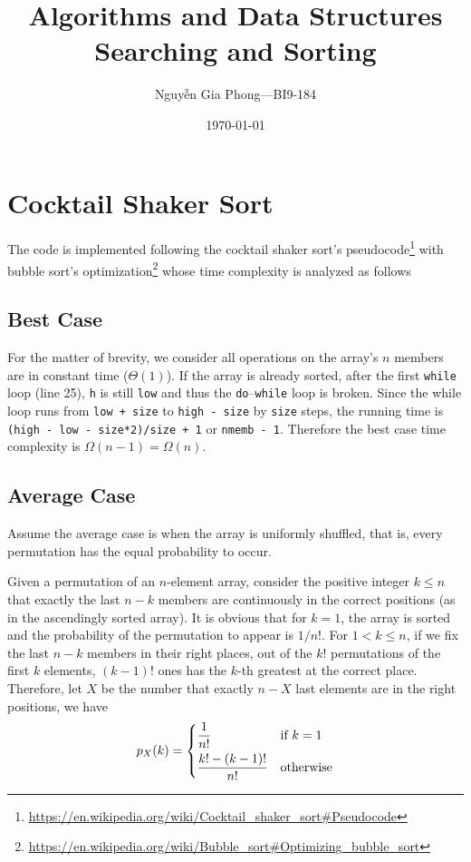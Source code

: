 \documentclass[a4paper,12pt]{article}
\title{Algorithms and Data Structures\\ Searching and Sorting}
\author{Nguyễn Gia Phong---BI9-184}
\date{\dateenglish\today}
\begin{document}
\maketitle
\section{Cocktail Shaker Sort}
The code is implemented following the cocktail shaker sort's
pseudocode\footnote{\url{https://en.wikipedia.org/wiki/Cocktail\_shaker\_sort\#Pseudocode}}
with bubble sort's optimization\footnote{\url{https://en.wikipedia.org/wiki/Bubble\_sort\#Optimizing\_bubble\_sort}}
whose time complexity is analyzed as follows

\subsection{Best Case}
For the matter of brevity, we consider all operations on the array's $n$ members
are in constant time ($\Theta(1)$).  If the array is already sorted, after
the first \verb|while| loop (line 25), \verb|h| is still \verb|low| and thus
the \verb|do|--\verb|while| loop is broken.  Since the while loop runs from
\verb|low + size| to \verb|high - size| by \verb|size| steps, the running time
is \verb|(high - low - size*2)/size + 1| or \verb|nmemb - 1|.  Therefore
the best case time complexity is $\Omega(n - 1) = \Omega(n)$.

\subsection{Average Case}
Assume the average case is when the array is uniformly shuffled, that is,
every permutation has the equal probability to occur.

Given a permutation of an $n$-element array, consider the positive integer
$k \le n$ that exactly the last $n - k$ members are continuously in the
correct positions (as in the ascendingly sorted array).  It is obvious that
for $k = 1$, the array is sorted and the probability of the permutation
to appear is $1/n!$.  For $1 < k \le n$, if we fix the last $n - k$ members
in their right places, out of the $k!$ permutations of the first $k$ elements,
$(k - 1)!$ ones has the $k$-th greatest at the correct place.  Therefore,
let $X$ be the number that exactly $n - X$ last elements are in
the right positions, we have
\[p_X(k) = \begin{dcases}
  \frac{1}{n!} &\text{if }k = 1\\
  \frac{k! - (k - 1)!}{n!} &\text{otherwise}
\end{dcases}\]
\end{document}
